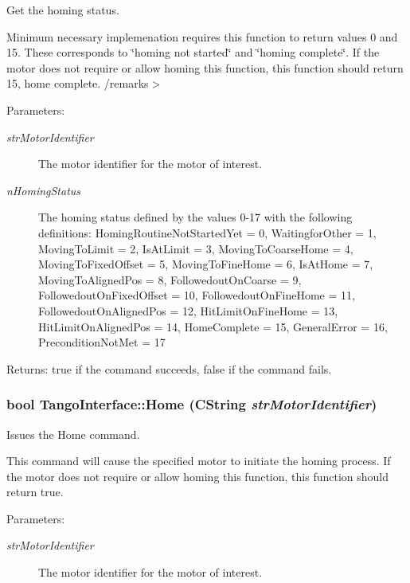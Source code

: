 Get the homing status. 

Minimum necessary implemenation requires this function to return values 0 and 15. These corresponds to \char`\"{}homing not started\char`\"{} and \char`\"{}homing complete\char`\"{}. If the motor does not require or allow homing this function, this function should return 15, home complete. /remarks$>$ \begin{Desc}
\item[Parameters:]
\begin{description}
\item[{\em strMotorIdentifier}]The motor identifier for the motor of interest.\item[{\em nHomingStatus}]The homing status defined by the values 0-17 with the following definitions: HomingRoutineNotStartedYet = 0, WaitingforOther = 1, MovingToLimit = 2, IsAtLimit = 3, MovingToCoarseHome = 4, MovingToFixedOffset = 5, MovingToFineHome = 6, IsAtHome = 7, MovingToAlignedPos = 8, FollowedoutOnCoarse = 9, FollowedoutOnFixedOffset = 10, FollowedoutOnFineHome = 11, FollowedoutOnAlignedPos = 12, HitLimitOnFineHome = 13, HitLimitOnAlignedPos = 14, HomeComplete = 15, GeneralError = 16, PreconditionNotMet = 17 \end{description}
\end{Desc}


\begin{Desc}
\item[Returns:]true if the command succeeds, false if the command fails. \end{Desc}
\hypertarget{classTangoInterface_e6da63765a09f8c53a8537faee7f63b5}{
\subsubsection[Home]{\setlength{\rightskip}{0pt plus 5cm}bool TangoInterface::Home (CString {\em strMotorIdentifier})}}
\label{classTangoInterface_e6da63765a09f8c53a8537faee7f63b5}


Issues the Home command. 

This command will cause the specified motor to initiate the homing process. If the motor does not require or allow homing this function, this function should return true.

\begin{Desc}
\item[Parameters:]
\begin{description}
\item[{\em strMotorIdentifier}]The motor identifier for the motor of interest.\end{description}
\end{Desc}


